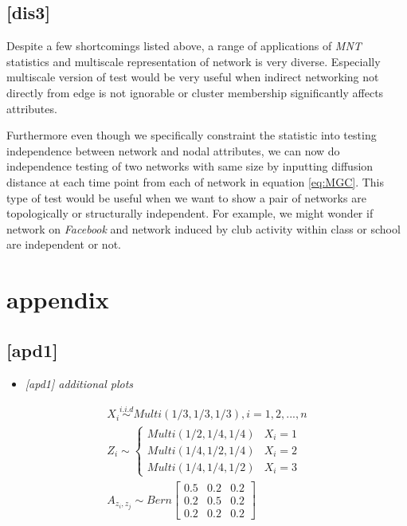 \documentclass[12pt]{article}
\theoremstyle{definition}
\begin{document}
	 

\subsection{[dis3]}

	Despite a few shortcomings listed above, a range of applications of \textit{MNT} statistics and multiscale representation of network is very diverse. Especially multiscale version of test would be very useful when indirect networking not directly from edge is not ignorable or cluster membership significantly affects attributes. 
	
	Furthermore even though we specifically constraint the statistic into testing independence between network and nodal attributes, we can now do independence testing of two networks with same size by inputting diffusion distance at each time point from each of network in equation \ref{eq:MGC}. This type of test would be useful when we want to show a pair of networks are topologically or structurally independent. For example, we might wonder if network on \textit{Facebook} and network induced by club activity within class or school are independent or not. 

	







\newpage
\appendix
\section{appendix}

\subsection{[apd1]}
\begin{itemize}
	\item {\it  [apd1] additional plots   \/}
\end{itemize}


\begin{equation}
\begin{gathered}
X_{i} \overset{i.i.d}{\sim} Multi(1/3, 1/3, 1/3), i = 1,2, ... , n \\ 
Z_{i}  \sim  \left\{  \begin{array}{ccc} Multi(1/2, 1/4, 1/4) & X_{i} = 1 \\ Multi(1/4, 1/2, 1/4) & X_{i} = 2 \\ Multi(1/4, 1/4, 1/2) & X_{i} = 3  \end{array} \right. \\
A_{z_{i}, z_{j}} \sim Bern \left[  \begin{array}{ccc}   0.5 & 0.2 &  0.2  \\ 0.2 & 0.5 & 0. 2  \\ 0.2 & 0.2 & 0.2  \end{array}  \right]
\end{gathered}
\end{equation}
\end{document}
